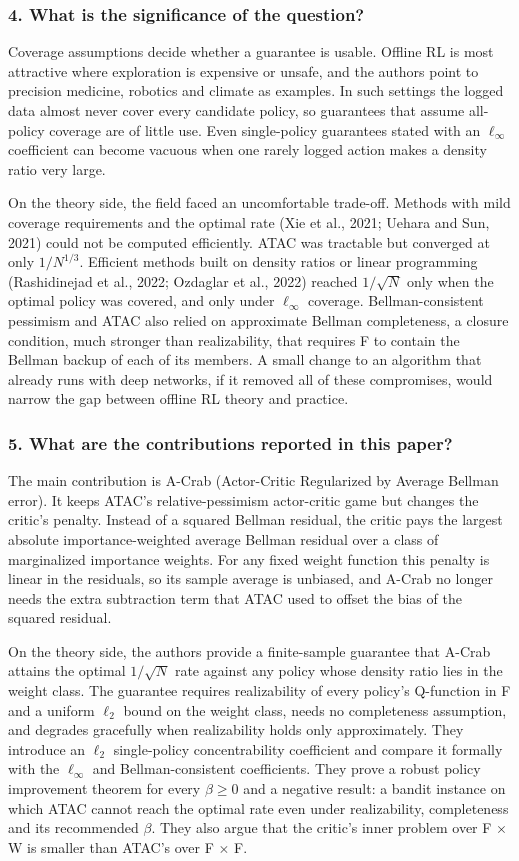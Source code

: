 \documentclass[11pt]{article}
\newcommand{\question}[1]{\subsubsection*{#1}}
\begin{document}
\question{4. What is the significance of the question?}

Coverage assumptions decide whether a guarantee is usable. Offline RL is most attractive where exploration is expensive or unsafe, and the authors point to precision medicine, robotics and climate as examples. In such settings the logged data almost never cover every candidate policy, so guarantees that assume all-policy coverage are of little use. Even single-policy guarantees stated with an $\ell_\infty$ coefficient can become vacuous when one rarely logged action makes a density ratio very large.

On the theory side, the field faced an uncomfortable trade-off. Methods with mild coverage requirements and the optimal rate (Xie et al., 2021; Uehara and Sun, 2021) could not be computed efficiently. ATAC was tractable but converged at only $1/N^{1/3}$. Efficient methods built on density ratios or linear programming (Rashidinejad et al., 2022; Ozdaglar et al., 2022) reached $1/\sqrt{N}$ only when the optimal policy was covered, and only under $\ell_\infty$ coverage. Bellman-consistent pessimism and ATAC also relied on approximate Bellman completeness, a closure condition, much stronger than realizability, that requires F to contain the Bellman backup of each of its members. A small change to an algorithm that already runs with deep networks, if it removed all of these compromises, would narrow the gap between offline RL theory and practice.

\question{5. What are the contributions reported in this paper?}

The main contribution is A-Crab (Actor-Critic Regularized by Average Bellman error). It keeps ATAC's relative-pessimism actor-critic game but changes the critic's penalty. Instead of a squared Bellman residual, the critic pays the largest absolute importance-weighted average Bellman residual over a class of marginalized importance weights. For any fixed weight function this penalty is linear in the residuals, so its sample average is unbiased, and A-Crab no longer needs the extra subtraction term that ATAC used to offset the bias of the squared residual.

On the theory side, the authors provide a finite-sample guarantee that A-Crab attains the optimal $1/\sqrt{N}$ rate against any policy whose density ratio lies in the weight class. The guarantee requires realizability of every policy's Q-function in F and a uniform $\ell_2$ bound on the weight class, needs no completeness assumption, and degrades gracefully when realizability holds only approximately. They introduce an $\ell_2$ single-policy concentrability coefficient and compare it formally with the $\ell_\infty$ and Bellman-consistent coefficients. They prove a robust policy improvement theorem for every $\beta\ge 0$ and a negative result: a bandit instance on which ATAC cannot reach the optimal rate even under realizability, completeness and its recommended \ensuremath{\beta}. They also argue that the critic's inner problem over F \ensuremath{\times} W is smaller than ATAC's over F \ensuremath{\times} F.
\end{document}
